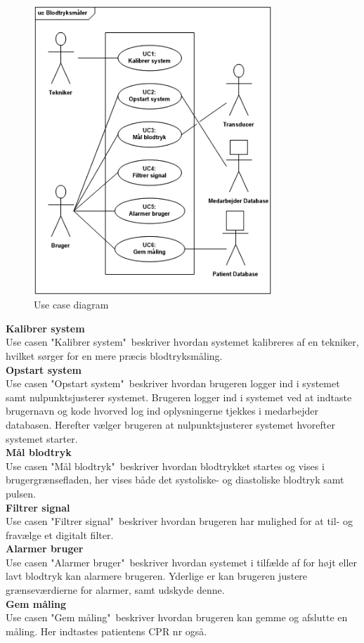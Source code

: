 \begin{figure}[H]
	\centering
	\includegraphics[width=0.8\textwidth]{Figurer/ISE/UcDiagram2}
	\caption{Use case diagram}
	\label{UC diagram}
\end{figure}

\textbf{Kalibrer system}\\
Use casen "Kalibrer system"\ beskriver hvordan systemet kalibreres af en tekniker, hvilket sørger for en mere præcis blodtryksmåling.\\[1ex]
\textbf{Opstart system}\\
Use casen "Opstart system"\ beskriver hvordan brugeren logger ind i systemet samt nulpunktsjusterer systemet. Brugeren logger ind i systemet ved at indtaste brugernavn og kode hvorved log ind oplysningerne tjekkes i medarbejder databasen. Herefter vælger brugeren at nulpunktsjusterer systemet hvorefter systemet starter.\\[1ex]
\textbf{Mål blodtryk}\\
Use casen "Mål blodtryk"\ beskriver hvordan blodtrykket startes og vises i brugergrænsefladen, her vises både det systoliske- og diastoliske blodtryk samt pulsen.\\[1ex]
\textbf{Filtrer signal}\\
Use casen "Filtrer signal"\ beskriver hvordan brugeren har mulighed for at til- og fravælge et digitalt filter.\\[1ex]
\textbf{Alarmer bruger}\\
Use casen "Alarmer bruger"\ beskriver hvordan systemet i tilfælde af for højt eller lavt blodtryk kan alarmere brugeren. Yderlige er kan brugeren justere grænseværdierne for alarmer, samt udskyde denne.\\[1ex]
\textbf{Gem måling}\\
Use casen "Gem måling"\ beskriver hvordan brugeren kan gemme og afslutte en måling. Her indtastes patientens CPR nr også.

